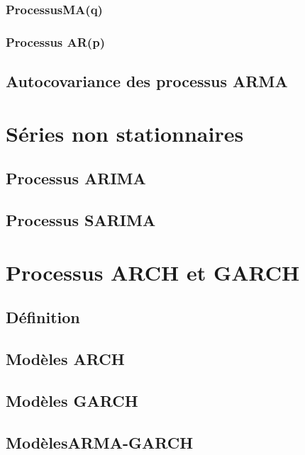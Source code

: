 \documentclass[
]{book}
\begin{document}
\hypertarget{processusmaq}{%
\subsection{ProcessusMA(q)}\label{processusmaq}}

\hypertarget{processus-arp}{%
\subsection{Processus AR(p)}\label{processus-arp}}

\hypertarget{autocovariance-des-processus-arma}{%
\section{Autocovariance des processus ARMA}\label{autocovariance-des-processus-arma}}

\hypertarget{proc-non-stat}{%
\chapter{Séries non stationnaires}\label{proc-non-stat}}

\hypertarget{processus-arima}{%
\section{Processus ARIMA}\label{processus-arima}}

\hypertarget{processus-sarima}{%
\section{Processus SARIMA}\label{processus-sarima}}

\hypertarget{ARCH-GARCH}{%
\chapter{Processus ARCH et GARCH}\label{ARCH-GARCH}}

\hypertarget{duxe9finition-6}{%
\section{Définition}\label{duxe9finition-6}}

\hypertarget{moduxe8les-arch}{%
\section{Modèles ARCH}\label{moduxe8les-arch}}

\hypertarget{moduxe8les-garch}{%
\section{Modèles GARCH}\label{moduxe8les-garch}}

\hypertarget{moduxe8lesarma-garch}{%
\section{ModèlesARMA-GARCH}\label{moduxe8lesarma-garch}}

  
\end{document}
